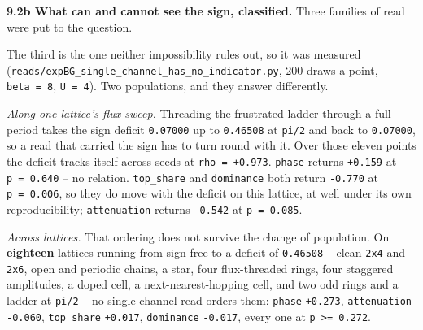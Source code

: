 \documentclass[10pt,letterpaper,twocolumn]{article}
\begin{document}
\textbf{9.2b What can and cannot see the sign, classified.} Three families of read were put to the
question.


The third is the one neither impossibility rules out, so it was measured
(\texttt{reads/\allowbreak{}expBG\_\allowbreak{}single\_\allowbreak{}channel\_\allowbreak{}has\_\allowbreak{}no\_\allowbreak{}indicator.\allowbreak{}py}, 200 draws a point, \texttt{beta\ =\allowbreak{}\ 8}, \texttt{U\ =\allowbreak{}\ 4}). Two
populations, and they answer differently.

\emph{Along one lattice's flux sweep.} Threading the frustrated ladder through a full period takes the
sign deficit \texttt{0.\allowbreak{}07000} up to \texttt{0.\allowbreak{}46508} at \texttt{pi/\allowbreak{}2} and back to \texttt{0.\allowbreak{}07000}, so a read that carried the
sign has to turn round with it. Over those eleven points the deficit tracks itself across seeds at
\texttt{rho\ =\allowbreak{}\ +\allowbreak{}0.\allowbreak{}973}. \texttt{phase} returns \texttt{+\allowbreak{}0.\allowbreak{}159} at \texttt{p\ =\allowbreak{}\ 0.\allowbreak{}640} -- no relation. \texttt{top\_\allowbreak{}share} and
\texttt{dominance} both return \texttt{-{}\allowbreak{}0.\allowbreak{}770} at \texttt{p\ =\allowbreak{}\ 0.\allowbreak{}006}, so they do move with the deficit on this lattice,
at well under its own reproducibility; \texttt{attenuation} returns \texttt{-{}\allowbreak{}0.\allowbreak{}542} at \texttt{p\ =\allowbreak{}\ 0.\allowbreak{}085}.

\emph{Across lattices.} That ordering does not survive the change of population. On \textbf{eighteen}
lattices running from sign-free to a deficit of \texttt{0.\allowbreak{}46508} -- clean \texttt{2x4} and \texttt{2x6}, open and
periodic chains, a star, four flux-threaded rings, four staggered amplitudes, a doped cell, a
next-nearest-hopping cell, and two odd rings and a ladder at \texttt{pi/\allowbreak{}2} -- no single-channel read orders
them: \texttt{phase} \texttt{+\allowbreak{}0.\allowbreak{}273}, \texttt{attenuation} \texttt{-{}\allowbreak{}0.\allowbreak{}060}, \texttt{top\_\allowbreak{}share} \texttt{+\allowbreak{}0.\allowbreak{}017}, \texttt{dominance} \texttt{-{}\allowbreak{}0.\allowbreak{}017}, every
one at \texttt{p\ \textgreater{}\allowbreak{}=\allowbreak{}\ 0.\allowbreak{}272}.
\end{document}
